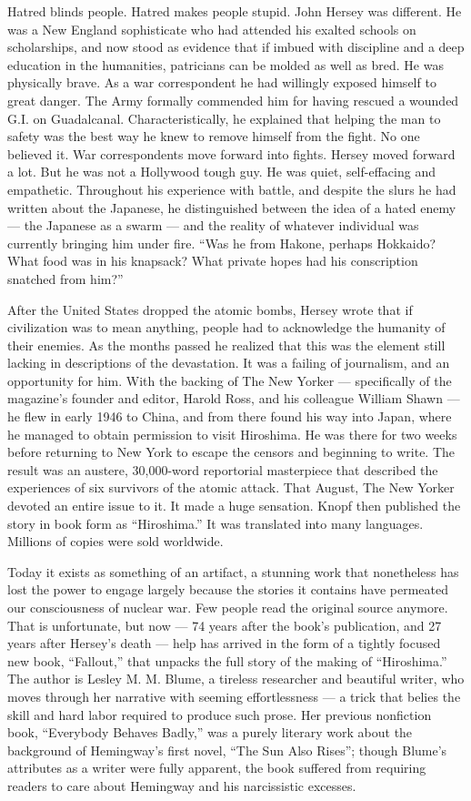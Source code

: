 Hatred blinds people. Hatred makes people stupid. John Hersey was
different. He was a New England sophisticate who had attended his
exalted schools on scholarships, and now stood as evidence that if
imbued with discipline and a deep education in the humanities,
patricians can be molded as well as bred. He was physically brave. As a
war correspondent he had willingly exposed himself to great danger. The
Army formally commended him for having rescued a wounded G.I. on
Guadalcanal. Characteristically, he explained that helping the man to
safety was the best way he knew to remove himself from the fight. No one
believed it. War correspondents move forward into fights. Hersey moved
forward a lot. But he was not a Hollywood tough guy. He was quiet,
self-effacing and empathetic. Throughout his experience with battle, and
despite the slurs he had written about the Japanese, he distinguished
between the idea of a hated enemy --- the Japanese as a swarm --- and
the reality of whatever individual was currently bringing him under
fire. ``Was he from Hakone, perhaps Hokkaido? What food was in his
knapsack? What private hopes had his conscription snatched from him?''

After the United States dropped the atomic bombs, Hersey wrote that if
civilization was to mean anything, people had to acknowledge the
humanity of their enemies. As the months passed he realized that this
was the element still lacking in descriptions of the devastation. It was
a failing of journalism, and an opportunity for him. With the backing of
The New Yorker --- specifically of the magazine's founder and editor,
Harold Ross, and his colleague William Shawn --- he flew in early 1946
to China, and from there found his way into Japan, where he managed to
obtain permission to visit Hiroshima. He was there for two weeks before
returning to New York to escape the censors and beginning to write. The
result was an austere, 30,000-word reportorial masterpiece that
described the experiences of six survivors of the atomic attack. That
August, The New Yorker devoted an entire issue to it. It made a huge
sensation. Knopf then published the story in book form as ``Hiroshima.''
It was translated into many languages. Millions of copies were sold
worldwide.

Today it exists as something of an artifact, a stunning work that
nonetheless has lost the power to engage largely because the stories it
contains have permeated our consciousness of nuclear war. Few people
read the original source anymore. That is unfortunate, but now --- 74
years after the book's publication, and 27 years after Hersey's death
--- help has arrived in the form of a tightly focused new book,
``Fallout,'' that unpacks the full story of the making of ``Hiroshima.''
The author is Lesley M. M. Blume, a tireless researcher and beautiful
writer, who moves through her narrative with seeming effortlessness ---
a trick that belies the skill and hard labor required to produce such
prose. Her previous nonfiction book, ``Everybody Behaves Badly,'' was a
purely literary work about the background of Hemingway's first novel,
``The Sun Also Rises''; though Blume's attributes as a writer were fully
apparent, the book suffered from requiring readers to care about
Hemingway and his narcissistic excesses.

